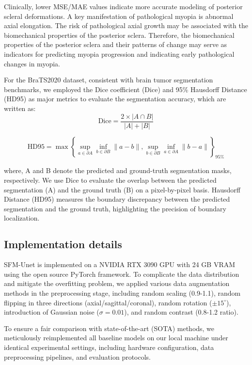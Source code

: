 \documentclass[AMA,Times1COL]{WileyNJDv5} %
\begin{document}
Clinically, lower MSE/MAE values indicate more accurate modeling of posterior scleral deformations. A key manifestation of pathological myopia is abnormal axial elongation. The risk of pathological axial growth may be associated with the biomechanical properties of the posterior sclera. Therefore, the biomechanical properties of the posterior sclera and their patterns of change may serve as indicators for predicting myopia progression and indicating early pathological changes in myopia.

For the BraTS2020 dataset, consistent with brain tumor segmentation benchmarks\cite{menze2014multimodal,chen2024adaptive}, we employed the Dice coefficient (Dice) and 95\% Hausdorff Distance (HD95) as major metrics to evaluate the segmentation accuracy, which are written as:
\begin{equation}
    \mathrm{Dice}=\frac{2\times|A\cap B|}{|A|+|B|}
\end{equation}

\begin{equation}
\mathrm{HD95}=\max\left\{\sup_{a\in\partial A}\inf_{b\in\partial B}\|a-b\|,\sup_{b\in\partial B}\inf_{a\in\partial A}\|b-a\|\right\}_{95\%}
\end{equation}

where, A and B denote the predicted and ground-truth segmentation masks, respectively. We use Dice to evaluate the overlap between the predicted segmentation (A) and the ground truth (B) on a pixel-by-pixel basis. Hausdorff Distance (HD95) measures the boundary discrepancy between the predicted segmentation and the ground truth, highlighting the precision of boundary localization.

\subsection{Implementation details}
SFM-Unet is implemented on a NVIDIA RTX 3090 GPU with 24 GB VRAM using the open source PyTorch framework. To complicate the data distribution and mitigate the overfitting problem, we applied various data augmentation methods in the preprocessing stage, including random scaling (0.9-1.1), random flipping in three directions (axial/sagittal/coronal), random rotation ($\pm 15^\circ$), introduction of Gaussian noise ($\sigma = 0.01$), and random contrast (0.8-1.2 ratio). 

To ensure a fair comparison with state-of-the-art (SOTA) methods, we meticulously reimplemented all baseline models on our local machine under identical experimental settings, including hardware configuration, data preprocessing pipelines, and evaluation protocols. 
\end{document}
